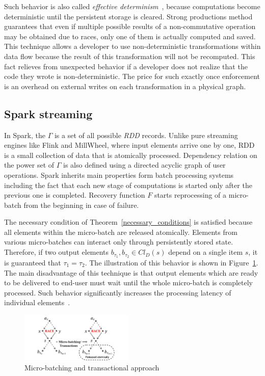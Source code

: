 Such behavior is also called {\em effective determinism}~\cite{akidau2018streaming}, because computations become deterministic until the persistent storage is cleared. Strong productions method guarantees that even if multiple possible results of a non-commutative operation may be obtained due to races, only one of them is actually computed and saved. This technique allows a developer to use non-deterministic transformations within data flow because the result of this transformation will not be recomputed. This fact relieves from unexpected behavior if a developer does not realize that the code they wrote is non-deterministic. The price for such exactly once enforcement is an overhead on external writes on each transformation in a physical graph.

\subsection{Spark streaming}

In Spark, the  $\Gamma$ is a set of all possible {\em RDD} records. Unlike pure streaming engines like Flink and MillWheel, where input elements arrive one by one, RDD is a small collection of data that is atomically processed. Dependency relation on the power set of $\Gamma$ is also defined using a directed acyclic graph of user operations. Spark inherits main properties form batch processing systems including the fact that each new stage of computations is started only after the previous one is completed. Recovery function $F$ starts reprocessing of a micro-batch from the beginning in case of failure.

The necessary condition of Theorem~\ref{necessary_conditions} is satisfied because all elements within the micro-batch are released atomically. Elements from various micro-batches can interact only through persistently stored state. Therefore, if two output elements $b_{\tau_1},b_{\tau_2} \in Cl_D(s)$ depend on a single item $s$, it is guaranteed that $\tau_1=\tau_2$. The illustration of this behavior is shown in Figure~\ref{spark_flink}. The main disadvantage of this technique is that output elements which are ready to be delivered to end-user must wait until the whole micro-batch is completely processed. Such behavior significantly increases the processing latency of individual elements~\cite{karimov2018benchmarking}.
 
\begin{figure}[htbp]
  \centering
  \includegraphics[width=0.48\textwidth]{pics/spark-flink}
  \caption{Micro-batching and transactional approach}
  \label{spark_flink}
\end{figure}
 
